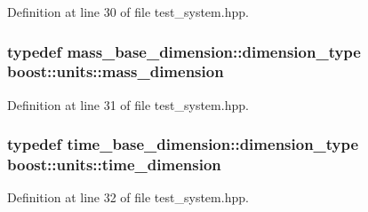 Definition at line 30 of file test\+\_\+system.\+hpp.

\subsubsection[{\texorpdfstring{mass\+\_\+dimension}{mass_dimension}}]{\setlength{\rightskip}{0pt plus 5cm}typedef mass\+\_\+base\+\_\+dimension\+::dimension\+\_\+type {\bf boost\+::units\+::mass\+\_\+dimension}}\hypertarget{namespaceboost_1_1units_a5baec398fcf78171420ff24e743f1faa}{}\label{namespaceboost_1_1units_a5baec398fcf78171420ff24e743f1faa}


Definition at line 31 of file test\+\_\+system.\+hpp.

\subsubsection[{\texorpdfstring{time\+\_\+dimension}{time_dimension}}]{\setlength{\rightskip}{0pt plus 5cm}typedef time\+\_\+base\+\_\+dimension\+::dimension\+\_\+type {\bf boost\+::units\+::time\+\_\+dimension}}\hypertarget{namespaceboost_1_1units_a8fc0b5bca117a7c220c018021ebe821f}{}\label{namespaceboost_1_1units_a8fc0b5bca117a7c220c018021ebe821f}


Definition at line 32 of file test\+\_\+system.\+hpp.

